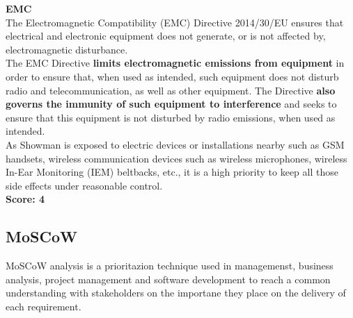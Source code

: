 \textbf{EMC} \\
The Electromagnetic Compatibility (EMC) Directive 2014/30/EU ensures that electrical and electronic equipment does not generate, or is not affected by, electromagnetic disturbance. \\
The EMC Directive \textbf{limits electromagnetic emissions from equipment} in order to ensure that, when used as intended, such equipment does not disturb radio and telecommunication, as well as other equipment. The Directive \textbf{also governs the immunity of such equipment to interference} and seeks to ensure that this equipment is not disturbed by radio emissions, when used as intended. \\
As Showman is exposed to electric devices or installations nearby such as GSM handsets, wireless communication devices such as wireless microphones, wireless In-Ear Monitoring (IEM) beltbacks, etc., it is a high priority to keep all those side effects under reasonable control. \\
\textbf{Score: 4} \newline





\subsection{MoSCoW}
MoSCoW analysis is a prioritazion technique used in managemenst, business analysis, project management and software development to reach a common understanding with stakeholders on the importane they place on the delivery of each requirement. \\

